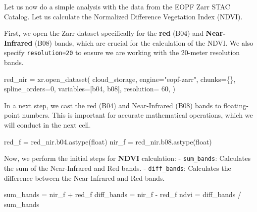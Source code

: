 \documentclass[
  letterpaper,
  DIV=11,
  numbers=noendperiod]{scrreprt}
\newenvironment{Shaded}{\begin{snugshade}}{\end{snugshade}}
\newcommand{\BuiltInTok}[1]{\textcolor[rgb]{0.00,0.23,0.31}{#1}}
\newcommand{\DecValTok}[1]{\textcolor[rgb]{0.68,0.00,0.00}{#1}}
\newcommand{\NormalTok}[1]{\textcolor[rgb]{0.00,0.23,0.31}{#1}}
\newcommand{\OperatorTok}[1]{\textcolor[rgb]{0.37,0.37,0.37}{#1}}
\newcommand{\StringTok}[1]{\textcolor[rgb]{0.13,0.47,0.30}{#1}}
\begin{document}
Let us now do a simple analysis with the data from the EOPF Zarr STAC
Catalog. Let us calculate the Normalized Difference Vegetation Index
(NDVI).

First, we open the Zarr dataset specifically for the \textbf{red} (B04)
and \textbf{Near-Infrared} (B08) bands, which are crucial for the
calculation of the NDVI. We also specify \texttt{resolution=20} to
ensure we are working with the 20-meter resolution bands.

\begin{Shaded}
\begin{Highlighting}[]
\NormalTok{red\_nir }\OperatorTok{=}\NormalTok{ xr.open\_dataset(}
\NormalTok{    cloud\_storage,}
\NormalTok{    engine}\OperatorTok{=}\StringTok{"eopf{-}zarr"}\NormalTok{,}
\NormalTok{    chunks}\OperatorTok{=}\NormalTok{\{\},}
\NormalTok{    spline\_orders}\OperatorTok{=}\DecValTok{0}\NormalTok{,}
\NormalTok{    variables}\OperatorTok{=}\NormalTok{[}\StringTok{\textquotesingle{}b04\textquotesingle{}}\NormalTok{, }\StringTok{\textquotesingle{}b08\textquotesingle{}}\NormalTok{],}
\NormalTok{    resolution}\OperatorTok{=} \DecValTok{60}\NormalTok{,}
\NormalTok{)}
\end{Highlighting}
\end{Shaded}

In a next step, we cast the red (B04) and Near-Infrared (B08) bands to
floating-point numbers. This is important for accurate mathematical
operations, which we will conduct in the next cell.

\begin{Shaded}
\begin{Highlighting}[]
\NormalTok{red\_f }\OperatorTok{=}\NormalTok{ red\_nir.b04.astype(}\BuiltInTok{float}\NormalTok{)}
\NormalTok{nir\_f }\OperatorTok{=}\NormalTok{ red\_nir.b08.astype(}\BuiltInTok{float}\NormalTok{)}
\end{Highlighting}
\end{Shaded}

Now, we perform the initial steps for \textbf{NDVI} calculation: -
\texttt{sum\_bands}: Calculates the sum of the Near-Infrared and Red
bands. - \texttt{diff\_bands}: Calculates the difference between the
Near-Infrared and Red bands.

\begin{Shaded}
\begin{Highlighting}[]
\NormalTok{sum\_bands }\OperatorTok{=}\NormalTok{ nir\_f }\OperatorTok{+}\NormalTok{ red\_f}
\NormalTok{diff\_bands }\OperatorTok{=}\NormalTok{ nir\_f }\OperatorTok{{-}}\NormalTok{ red\_f}
\NormalTok{ndvi }\OperatorTok{=}\NormalTok{ diff\_bands }\OperatorTok{/}\NormalTok{ sum\_bands}
\end{Highlighting}
\end{Shaded}
\end{document}

